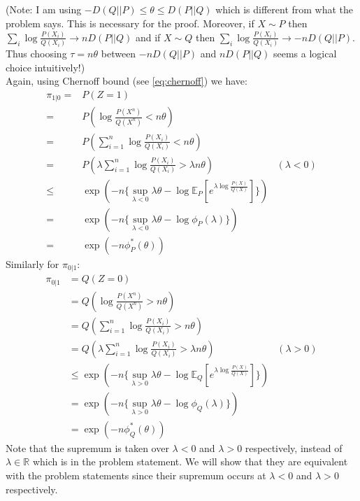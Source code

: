 \documentclass{article}
\numberwithin{equation}{section}
\newcommand{\EX}[2][]{\mathbb{E}_{#1}\left[#2\right]}%
\begin{document}
\subsection{}

(Note: I am using \(-D(Q||P) \le \theta \le D(P||Q)\) which is different from what the problem says.
This is necessary for the proof.
Moreover, if \(X\sim P\) then \(\sum_i \log \frac{P(X_i)}{Q(X_i)} \to nD(P||Q)\) and if \(X\sim Q\) then \(\sum_i \log \frac{P(X_i)}{Q(X_i)} \to -nD(Q||P)\).
Thus choosing \(\tau = n\theta\) between \(-nD(Q||P)\) and \(nD(P||Q)\) seems a logical choice intuitively!)\\
Again, using Chernoff bound (see \eqref{eq:chernoff}) we have:
\begin{align}
\pi_{1|0} =& P(Z=1) \\
=& P\left( \log \frac{P(X^n)}{Q(X^n)} < n\theta \right)\\
=& P\left( \sum_{i=1}^n \log \frac{P(X_i)}{Q(X_i)} < n\theta \right)\\
=& P\left( \lambda \sum_{i=1}^n \log \frac{P(X_i)}{Q(X_i)} > \lambda n\theta \right) & (\lambda < 0)\\
\le& \exp (-n \{\sup_{\lambda < 0} \lambda \theta - \log \EX[P]{e^{\lambda \log \frac{P(X)}{Q(X)}}}\})\\
=& \exp (-n \{\sup_{\lambda < 0} \lambda \theta - \log \phi_P(\lambda)\})\\
=& \exp(-n \phi_P^*(\theta))
\end{align}
Similarly for \(\pi_{0|1}\):
\begin{align}
\pi_{0|1} &= Q(Z=0) \\
&= Q\left( \log \frac{P(X^n)}{Q(X^n)} > n\theta \right)\\
&= Q\left( \sum_{i=1}^n \log \frac{P(X_i)}{Q(X_i)} > n\theta \right)\\
&= Q\left( \lambda \sum_{i=1}^n \log \frac{P(X_i)}{Q(X_i)} > \lambda n\theta \right) & (\lambda > 0)\\
&\le \exp (-n \{\sup_{\lambda > 0} \lambda \theta - \log \EX[Q]{e^{\lambda \log \frac{P(X)}{Q(X)}}}\})\\
&= \exp (-n \{\sup_{\lambda > 0} \lambda \theta - \log \phi_Q(\lambda)\})\\
&= \exp(-n \phi_Q^*(\theta))
\end{align}
Note that the supremum is taken over \(\lambda < 0\) and \(\lambda > 0\) respectively, instead of \(\lambda \in \mathbb{R}\) which is in the problem statement.
We will show that they are equivalent with the problem statements since their supremum occurs at \(\lambda < 0\) and \(\lambda > 0\) respectively.\\
\end{document}

